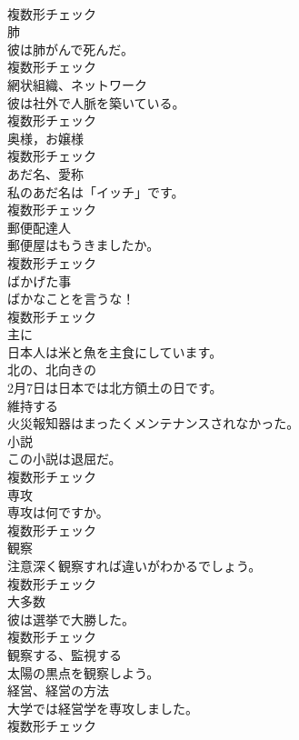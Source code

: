 \documentclass[8pt]{extreport}
\begin{document}
\begin{CJK}{UTF8}{min}
\\	複数形チェック
\\	[名詞]	肺	
\\	彼は肺がんで死んだ。	
\\	複数形チェック
\\	[名詞]	網状組織、ネットワーク	
\\	彼は社外で人脈を築いている。	
\\	複数形チェック
\\	[名詞]	奥様，お嬢様	
\\	複数形チェック
\\	[名詞]	あだ名、愛称	
\\	私のあだ名は「イッチ」です。	
\\	複数形チェック
\\	[名詞]	郵便配達人	
\\	郵便屋はもうきましたか。	
\\	複数形チェック
\\	[名詞]	ばかげた事	
\\	ばかなことを言うな！	
\\	複数形チェック
\\	[副詞]	主に	
\\	日本人は米と魚を主食にしています。	
\\	[形容詞]	北の、北向きの	
\\	2月7日は日本では北方領土の日です。	
\\	[動詞]	維持する	
\\	火災報知器はまったくメンテナンスされなかった。	
\\	[名詞]	小説	
\\	この小説は退屈だ。	
\\	複数形チェック
\\	[名詞]	専攻	
\\	専攻は何ですか。	
\\	複数形チェック
\\	[名詞]	観察	
\\	注意深く観察すれば違いがわかるでしょう。	
\\	複数形チェック
\\	[名詞]	大多数	
\\	彼は選挙で大勝した。	
\\	複数形チェック
\\	[動詞]	観察する、監視する	
\\	太陽の黒点を観察しよう。	
\\	[名詞]	経営、経営の方法	
\\	大学では経営学を専攻しました。	
\\	複数形チェック

\end{CJK}
\end{document}
